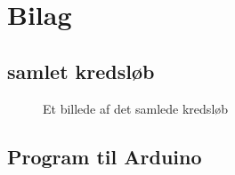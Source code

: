 \section{Bilag}
\subsection{samlet kredsløb} \label{bilag:samletkreds}
\begin{figure}[H]
  \centering
  \caption{Et billede af det samlede kredsløb}
  \label{}
\end{figure}
\newpage

\subsection{Program til Arduino}
\label{bilag:program}
\begin{lstlisting}

\end{lstlisting}